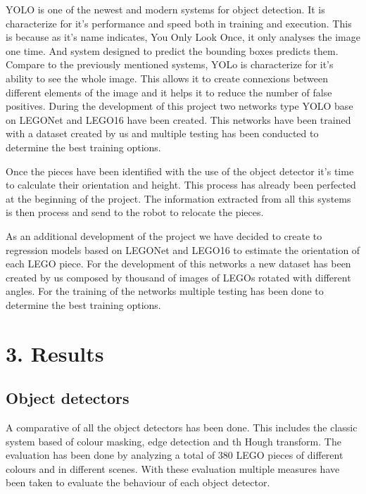 {YOLO is one of the newest and modern systems for object detection. It is characterize for it's performance and speed both in training and execution. This is because as it's name indicates, You Only Look Once, it only analyses the image one time. And system designed to predict the bounding boxes predicts them. Compare to the previously mentioned systems, YOLo is characterize for it's ability to see the whole image. This allows it to create connexions between different elements of the image and it helps it to reduce the number of false positives. During the development of this project two networks type YOLO base on LEGONet and LEGO16 have been created. This networks have been trained with a dataset created by us and multiple testing has been conducted to determine the best training options.

Once the pieces have been identified with the use of the object detector it's time to calculate their orientation and height. This process has already been perfected at the beginning of the project. The information extracted from all this systems is then process and send to the robot to relocate the pieces.

As an additional development of the project we have decided to create to regression models based on LEGONet and LEGO16 to estimate the orientation of each LEGO piece. For the development of this networks a new dataset has been created by us composed by thousand of images of LEGOs rotated with different angles. For the training of the networks multiple testing has been done to determine the best training options.

\section*{3. Results}
\subsection*{Object detectors}
A comparative of all the object detectors has been done. This includes the classic system based of colour masking, edge detection and th Hough transform. The evaluation has been done by analyzing a total of 380 LEGO pieces of different colours and in different scenes. With these evaluation multiple measures have been taken to evaluate the behaviour of each object detector.

}
